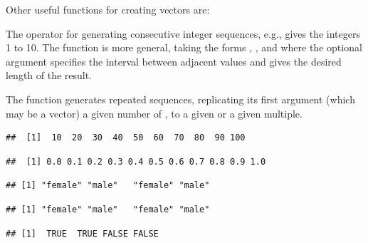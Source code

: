 \documentclass[11pt]{book}
\renewenvironment{knitrout}{\small\renewcommand{\baselinestretch}{.85}}{} %
\begin{document}
Other useful functions for creating vectors are:
\begin{itemize*}
  \item The \code{:} operator for generating consecutive integer sequences, e.g.,
   gives the integers 1 to 10.  The  function is more general, taking the forms
,
, and
 where the optional argument  specifies the interval between adjacent values and  gives the desired length of the
result.

  \item The  function generates repeated sequences, replicating
  its first argument (which may be a vector) a given number of ,
  to a given  or  a given multiple.
\end{itemize*}

\begin{knitrout}
\color{fgcolor}\begin{kframe}
\begin{alltt}
\hlstd{(}\hlstd{,} \hlstd{,} \hlstd{=}\hlstd{)}      
\end{alltt}
\begin{verbatim}
##  [1]  10  20  30  40  50  60  70  80  90 100
\end{verbatim}
\begin{alltt}
\hlstd{(}\hlstd{,} \hlstd{,} \hlstd{=}\hlstd{)}     
\end{alltt}
\begin{verbatim}
##  [1] 0.0 0.1 0.2 0.3 0.4 0.5 0.6 0.7 0.8 0.9 1.0
\end{verbatim}
\begin{alltt}
 \hlkwb{<-} \hlstd{(}\hlstd{(}\hlstd{,} \hlstd{),} \hlstd{=}\hlstd{))}
\end{alltt}
\begin{verbatim}
## [1] "female" "male"   "female" "male"
\end{verbatim}
\begin{alltt}
 \hlkwb{<-} \hlstd{(}\hlstd{(}\hlstd{,} \hlstd{),} \hlstd{=}\hlstd{))}  
\end{alltt}
\begin{verbatim}
## [1] "female" "male"   "female" "male"
\end{verbatim}
\begin{alltt}
 \hlkwb{<-} \hlstd{(}\hlstd{(}\hlstd{,} \hlstd{),} \hlstd{=}\hlstd{))}
\end{alltt}
\begin{verbatim}
## [1]  TRUE  TRUE FALSE FALSE
\end{verbatim}
\end{kframe}
\end{knitrout}
\end{document}
